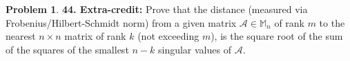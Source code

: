 \documentclass{book}
\theoremstyle{definition}
\newtheorem*{prob*}{Problem}
\newcommand{\A}{\mathcal{A}}
\begin{document}
\newpage




\begin{prob*}\textbf{44. Extra-credit:} Prove that the distance (measured via Frobenius/Hilbert-Schmidt norm) from a given matrix $\A \in \mathbb{M}_n$ of rank $m$ to the nearest $n\times n$ matrix of rank $k$ (not exceeding $m$), is the square root of the sum of the squares of the smallest $n-k$ singular values of $\A$. 
\end{prob*}
\end{document}
